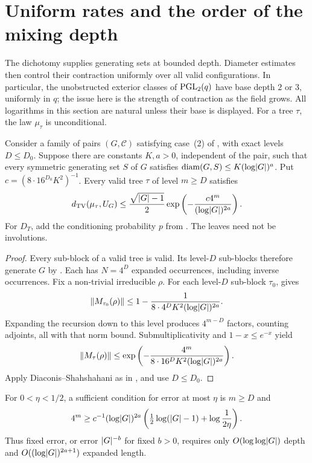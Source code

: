 \section{Uniform rates and the order of the mixing depth}
\label{sec:quantitative-families}

The dichotomy supplies generating sets at bounded depth. Diameter estimates
then control their contraction uniformly over all valid configurations.
In particular, the unobstructed exterior
classes of $\operatorname{PGL}_2(q)$ have base depth $2$ or $3$, uniformly in $q$;
the issue here is the strength of contraction as the field grows.
All logarithms in this section are natural
unless their base is displayed. For a tree $\tau$, the law $\mu_\tau$
is unconditional.

\begin{theorem}
\label{thm:family-rate}
Consider a family of pairs $(G,\mathcal C)$ satisfying case~\textup{(2)} of
, with exact levels $D\le D_0$. Suppose there are
constants $K,a>0$, independent of the pair, such that every symmetric
generating set $S$ of $G$ satisfies
$\mathrm{diam}(G,S)\le K(\log\lvert G \rvert)^a$.
Put $c=(8\cdot16^{D_0}K^2)^{-1}$. Every valid tree $\tau$ of
level $m\ge D$ satisfies
\begin{equation}\label{eq:family-rate}
 d_{\mathrm{TV}}(\mu_\tau,U_G)\le\frac{\sqrt{\lvert G \rvert-1}}2
       \exp\left(-\frac{c4^m}{(\log\lvert G \rvert)^{2a}}\right).
\end{equation}
For $D_T$, add the conditioning probability $p$ from .
The leaves need not be involutions.
\end{theorem}
\begin{proof}
Every sub-block of a valid tree is valid. Its level-$D$ sub-blocks therefore
generate $G$ by . Each has $N=4^D$ expanded occurrences,
including inverse occurrences. Fix a non-trivial irreducible $\rho$.
For each level-$D$ sub-block $\tau_0$,  gives
\[
 \lVert M_{\tau_0}(\rho) \rVert\le1-\frac1{8\cdot4^D K^2(\log\lvert G \rvert)^{2a}}.
\]
Expanding the recursion down to this level produces $4^{m-D}$ factors,
counting adjoints, all with that norm bound. Submultiplicativity and
$1-x\le e^{-x}$ yield
\[
 \lVert M_\tau(\rho) \rVert\le
 \exp\left(-\frac{4^m}{8\cdot16^D K^2(\log\lvert G \rvert)^{2a}}\right).
\]
Apply Diaconis--Shahshahani as in , and use $D\le D_0$.
\end{proof}

For $0<\eta<1/2$, a sufficient condition for error at most $\eta$ is
$m\ge D$ and
\begin{equation}\label{eq:family-accuracy}
 4^m\ge c^{-1}(\log\lvert G \rvert)^{2a}
       \left(\tfrac12\log(\lvert G \rvert-1)+\log\frac1{2\eta}\right).
\end{equation}
Thus fixed error, or error $\lvert G \rvert^{-b}$ for fixed $b>0$, requires only
$O(\log\log\lvert G \rvert)$ depth and $O((\log\lvert G \rvert)^{2a+1})$ expanded length.

